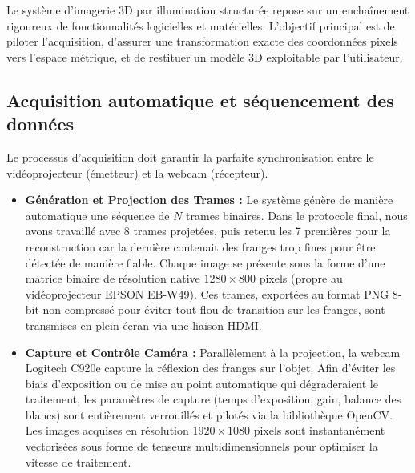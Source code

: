 \documentclass[10pt]{article} %
\begin{document}
Le système d'imagerie 3D par illumination structurée repose sur un enchaînement rigoureux de fonctionnalités logicielles et matérielles. L'objectif principal est de piloter l'acquisition, d'assurer une transformation exacte des coordonnées pixels vers l'espace métrique, et de restituer un modèle 3D exploitable par l'utilisateur. 

\subsection{Acquisition automatique et séquencement des données}
Le processus d'acquisition doit garantir la parfaite synchronisation entre le vidéoprojecteur (émetteur) et la webcam (récepteur).
\begin{itemize}
    \item \textbf{Génération et Projection des Trames :} Le système génère de manière automatique une séquence de $N$ trames binaires. Dans le protocole final, nous avons travaillé avec 8 trames projetées, puis retenu les 7 premières pour la reconstruction car la dernière contenait des franges trop fines pour être détectée de manière fiable. Chaque image se présente sous la forme d'une matrice binaire de résolution native $1280 \times 800$ pixels (propre au vidéoprojecteur EPSON EB-W49). Ces trames, exportées au format PNG 8-bit non compressé pour éviter tout flou de transition sur les franges, sont transmises en plein écran via une liaison HDMI.
    \item \textbf{Capture et Contrôle Caméra :} Parallèlement à la projection, la webcam Logitech C920e capture la réflexion des franges sur l'objet. Afin d'éviter les biais d'exposition ou de mise au point automatique qui dégraderaient le traitement, les paramètres de capture (temps d'exposition, gain, balance des blancs) sont entièrement verrouillés et pilotés via la bibliothèque OpenCV. Les images acquises en résolution $1920 \times 1080$ pixels sont instantanément vectorisées sous forme de tenseurs multidimensionnels pour optimiser la vitesse de traitement.
\end{itemize}
\end{document}
